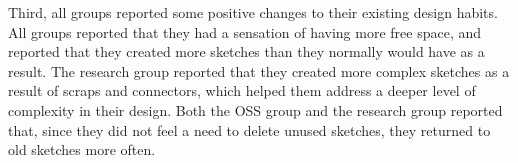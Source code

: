 \documentclass[12pt,fleqn]{ucithesis}
\begin{document}

Third, all groups reported some positive changes to their existing design habits. All groups reported that they had a sensation of having more free space, and reported that they created more sketches than they normally would have as a result. The research group reported that they created more complex sketches as a result of scraps and connectors, which helped them address a deeper level of complexity in their design. Both the OSS group and the research group reported that, since they did not feel a need to delete unused sketches, they returned to old sketches more often.



%
\end{document}
